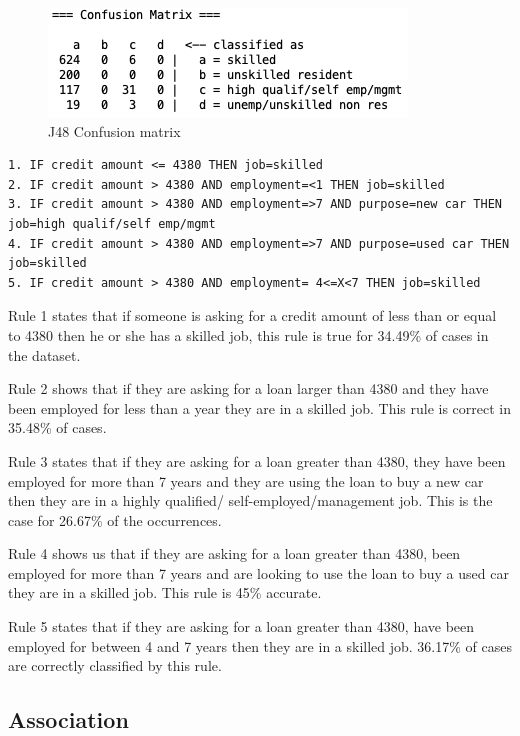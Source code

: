 \documentclass[12pt]{article}
\begin{document}
\begin{figure}
    \centering
    \includegraphics[scale=0.75]{img/conf_matrix.png}
    \caption{J48 Confusion matrix}
    \label{fig:j48_conf_matrix}
\end{figure}

\begin{lstlisting}[caption="J48 rules"\label{fig:j48_rules}]
1. IF credit amount <= 4380 THEN job=skilled
2. IF credit amount > 4380 AND employment=<1 THEN job=skilled
3. IF credit amount > 4380 AND employment=>7 AND purpose=new car THEN job=high qualif/self emp/mgmt
4. IF credit amount > 4380 AND employment=>7 AND purpose=used car THEN job=skilled
5. IF credit amount > 4380 AND employment= 4<=X<7 THEN job=skilled
\end{lstlisting}

Rule 1 states that if someone is asking for a credit amount of less than or equal to 4380 then he or she has a skilled job, this rule is true for 34.49\% of cases in the dataset. 

Rule 2 shows that if they are asking for a loan larger than 4380 and they have been employed for less than a year they are in a skilled job. This rule is correct in 35.48\% of cases.

Rule 3 states that if they are asking for a loan greater than 4380, they have been employed for more than 7 years and they are using the loan to buy a new car then they are in a highly qualified/ self-employed/management job. This is the case for 26.67\% of the occurrences.

Rule 4 shows us that if they are asking for a loan greater than 4380, been employed for more than 7 years and are looking to use the loan to buy a used car they are in a skilled job. This rule is 45\% accurate.

Rule 5 states that if they are asking for a loan greater than 4380, have been employed for between 4 and 7 years then they are in a skilled job. 36.17\% of cases are correctly classified by this rule.

\subsection{Association}
\end{document}
